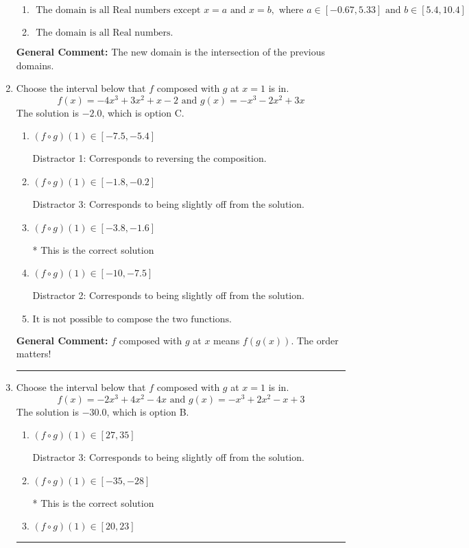 \documentclass{extbook}[14pt]
\newcommand{\litem}[1]{\item #1

\rule{\textwidth}{0.4pt}}
\begin{document}
\begin{enumerate}
{\begin{enumerate}[label=\Alph*.]
\item \( \text{ The domain is all Real numbers except } x = a \text{ and } x = b, \text{ where } a \in [-0.67, 5.33] \text{ and } b \in [5.4, 10.4] \)


\item \( \text{ The domain is all Real numbers. } \)


\end{enumerate}

\textbf{General Comment:} The new domain is the intersection of the previous domains.
}
\litem{
Choose the interval below that $f$ composed with $g$ at $x=1$ is in.
\[ f(x) = -4x^{3} +3 x^{2} +x -2 \text{ and } g(x) = -x^{3} -2 x^{2} +3 x \]The solution is \( -2.0 \), which is option C.\begin{enumerate}[label=\Alph*.]
\item \( (f \circ g)(1) \in [-7.5, -5.4] \)

 Distractor 1: Corresponds to reversing the composition.
\item \( (f \circ g)(1) \in [-1.8, -0.2] \)

 Distractor 3: Corresponds to being slightly off from the solution.
\item \( (f \circ g)(1) \in [-3.8, -1.6] \)

* This is the correct solution
\item \( (f \circ g)(1) \in [-10, -7.5] \)

 Distractor 2: Corresponds to being slightly off from the solution.
\item \( \text{It is not possible to compose the two functions.} \)


\end{enumerate}

\textbf{General Comment:} $f$ composed with $g$ at $x$ means $f(g(x))$. The order matters!
}
\litem{
Choose the interval below that $f$ composed with $g$ at $x=1$ is in.
\[ f(x) = -2x^{3} +4 x^{2} -4 x \text{ and } g(x) = -x^{3} +2 x^{2} -x + 3 \]The solution is \( -30.0 \), which is option B.\begin{enumerate}[label=\Alph*.]
\item \( (f \circ g)(1) \in [27, 35] \)

 Distractor 3: Corresponds to being slightly off from the solution.
\item \( (f \circ g)(1) \in [-35, -28] \)

* This is the correct solution
\item \( (f \circ g)(1) \in [20, 23] \)


\end{enumerate}}
\end{enumerate}
\end{document}
